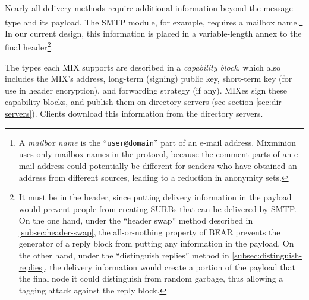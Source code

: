 \documentclass{llncs}
\begin{document}

Nearly all delivery methods require additional information beyond the
message type and its payload.  The SMTP module, for example, requires
a mailbox name.\footnote{A {\it mailbox name} is the ``{\tt user@domain}''
part of an e-mail address. Mixminion uses only mailbox names in the
protocol, because the comment parts of an e-mail address could potentially
be different for senders who have obtained an address from different
sources, leading to a reduction in anonymity sets.}
In our current design, this information is placed
in a variable-length annex to the final header\footnote{It must be
in the header, since putting delivery information in the payload would
prevent people from creating SURBs that can be delivered by SMTP.
On the one hand, under the ``header swap'' method described in
\ref{subsec:header-swap}, the all-or-nothing property of BEAR prevents
the generator of a reply block from putting any information in the
payload.  On the other hand, under the ``distinguish replies'' method
in \ref{subsec:distinguish-replies}, the delivery information would
create a portion of the payload that the final node it could
distinguish from random garbage, thus allowing a tagging attack
against the reply block.}.
%

The types each MIX supports are described in a \emph{capability
block}, which also includes the MIX's address, long-term (signing)
public key, short-term key (for use in header encryption), and
forwarding strategy (if any).  MIXes sign these capability blocks, and
publish them on directory servers (see section \ref{sec:dir-servers}).
Clients download this information from the directory servers.

%
\end{document}
